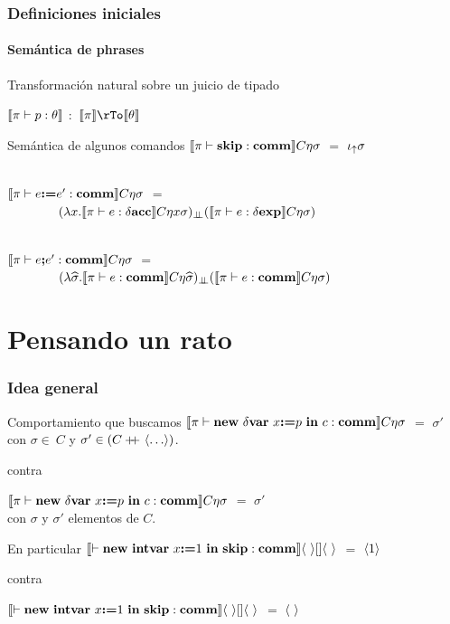 \documentclass{beamer} %
\begin{document}
\begin{frame}
\frametitle{Definiciones iniciales}
\framesubtitle{Sem\'antica de phrases}

\begin{block}{Transformaci\'on natural sobre un juicio de tipado}

$\llbracket \pi \vdash p : \theta \rrbracket$ $:$ $\semBrcks{\pi} \rTo \semBrcks{\theta}$

\end{block}

\begin{block}{Sem\'antica de algunos comandos}\small
$\llbracket  \pi \vdash \textbf{skip} : \textbf{comm}  \rrbracket C\eta\sigma$ 
$=$ $\iota_{\uparrow} \sigma$\\
\
			
$\llbracket  \pi \vdash e \textbf{:=} e' : \textbf{comm}  \rrbracket C\eta\sigma$ 
$=$ \\
\ \ \ \ \ \ \ \ $(\lambda x . \llbracket \pi \vdash e : \delta \textbf{acc} \rrbracket C\eta x \sigma)_{\bot \!\!\! \bot}
(\llbracket  \pi \vdash e : \delta \textbf{exp}  \rrbracket C\eta\sigma)$\\
\

$\llbracket  \pi \vdash e \textbf{;} e' : \textbf{comm}  \rrbracket C\eta\sigma$ 
$=$ \\
\ \ \ \ \ \ \ \ $(\lambda \widehat{\sigma} . \llbracket \pi \vdash e : \textbf{comm} \rrbracket C\eta\widehat{\sigma})_{\bot \!\!\! \bot}
(\llbracket  \pi \vdash e : \textbf{comm} \rrbracket C\eta\sigma)$\\
\end{block}

\end{frame}

\section{Pensando un rato}

\begin{frame}
\frametitle{Idea general}

\begin{block}{Comportamiento que buscamos}
$\llbracket \pi \vdash \textbf{new} \ \delta \textbf{var} \ x \textbf{:=} p \ \textbf{in} \ c : \textbf{comm} \rrbracket C\eta\sigma$ $=$ $\sigma'$\\
con $\sigma \in \ C$ y $\sigma' \in (C +\kern-1.3ex+\kern0.8ex \langle  \ldots  \rangle)$.

contra

$\llbracket \pi \vdash \textbf{new} \ \delta \textbf{var} \ x \textbf{:=} p \ \textbf{in} \ c : \textbf{comm} \rrbracket C\eta\sigma$ $=$ $\sigma'$\\
con $\sigma$ y $\sigma'$ elementos de $C$.
\end{block}

\begin{block}{En particular}
$\semBrcks{ \vdash \newvar{\intvar}{x}{1}{\cskip} : \commt}\lrangles{\ }[]\lrangles{\ }$ $=$ $\langle 1 \rangle$

contra

$\semBrcks{ \vdash \newvar{\intvar}{x}{1}{\cskip} : \commt}\lrangles{\ }[]\lrangles{\ }$ $=$ $\langle \  \rangle$
\end{block}
\end{frame}
\end{document}
